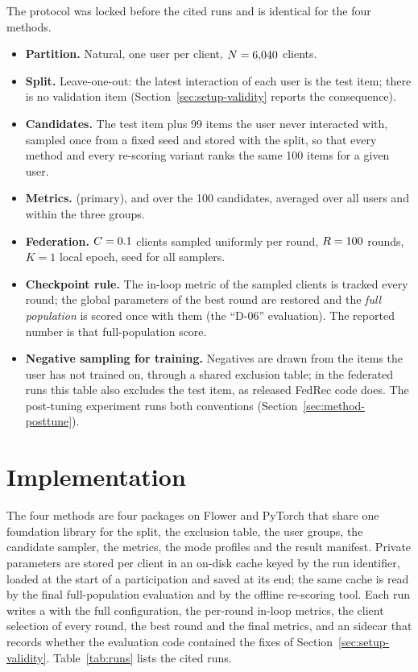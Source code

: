 The protocol was locked before the cited runs and is identical for the four methods.
\begin{itemize}[leftmargin=2em]
  \item \textbf{Partition.} Natural, one user per client, $N=6{,}040$ clients.
  \item \textbf{Split.} Leave-one-out: the latest interaction of each user is the test item;
        there is no validation item (Section~\ref{sec:setup-validity} reports the consequence).
  \item \textbf{Candidates.} The test item plus 99 items the user never interacted with,
        sampled once from a fixed seed and stored with the split, so that every method and every
        re-scoring variant ranks the same 100 items for a given user.
  \item \textbf{Metrics.} \ndcg{} (primary), \hr{} and \mrr{} over the 100 candidates,
        averaged over all \DsUsers{} users and within the three groups.
  \item \textbf{Federation.} $C=0.1$ clients sampled uniformly per round,
        $R=100$ rounds, $K=1$ local epoch, seed \Seed{} for all samplers.
  \item \textbf{Checkpoint rule.} The in-loop metric of the sampled clients is tracked every
        round; the global parameters of the best round are restored and the \emph{full
        population} is scored once with them (the ``D-06'' evaluation). The reported number is
        that full-population score.
  \item \textbf{Negative sampling for training.} Negatives are drawn from the items the user has
        not trained on, through a shared exclusion table; in the federated runs this table also
        excludes the test item, as released FedRec code does. The post-tuning experiment runs
        both conventions (Section~\ref{sec:method-posttune}).
\end{itemize}

\section{Implementation}
\label{sec:setup-impl}

The four methods are four packages on Flower \cite{beutel2020flower} and PyTorch
\cite{paszke2019pytorch} that share one foundation library for the split, the exclusion table,
the user groups, the candidate sampler, the metrics, the mode profiles and the result manifest.
Private parameters are stored per client in an on-disk cache keyed by the run identifier, loaded
at the start of a participation and saved at its end; the same cache is read by the final
full-population evaluation and by the offline re-scoring tool. Each run writes a
 with the full configuration, the per-round in-loop metrics, the client
selection of every round, the best round and the final metrics, and an
 sidecar that records whether the evaluation code contained the fixes
of Section~\ref{sec:setup-validity}. Table~\ref{tab:runs} lists the cited runs.

